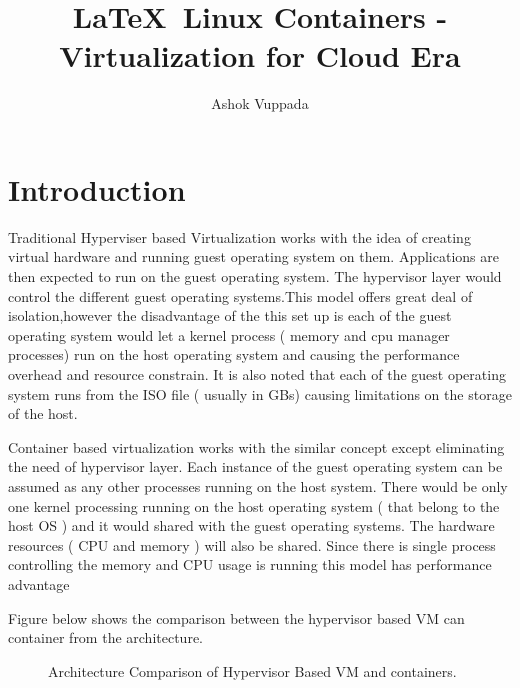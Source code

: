 \documentclass[9pt,twocolumn,twoside]{../../styles/osajnl}
\title{\LaTeX\ Linux Containers - Virtualization for  Cloud Era}
\author[1]{Ashok Vuppada}
\affil[1]{School of Informatics and Computing, Bloomington, IN 47408, U.S.A.}
\affil[*]{Corresponding authors: ashokmadhu66@gmail.com}
\begin{document}
\maketitle

\section{Introduction}

Traditional Hyperviser based Virtualization works with the idea of
creating virtual hardware and running guest operating system on
them. Applications are then expected to run on the guest operating
system. The hypervisor layer would control the different guest
operating systems.This model offers great deal of isolation,however
the disadvantage of the this set up is each of the guest operating
system would let a kernel process ( memory and cpu manager processes)
run on the host operating system and causing the performance overhead
and resource constrain. It is also noted that each of the guest
operating system runs from the ISO file ( usually in GBs) causing
limitations on the storage of the host. \cite{www-slashroot} 

Container based virtualization works with the similar concept except
eliminating the need of hypervisor layer. Each instance of the guest
operating system can be assumed as any other processes running on the
host system. There would be only one kernel processing running on the
host operating system ( that belong to the host OS ) and it would
shared with the guest operating systems. The hardware resources ( CPU
and memory ) will also be shared. Since there is single process
controlling the memory and CPU usage is running this model has
performance advantage \cite{www-slashroot}

Figure below shows the comparison between the hypervisor based VM can
container from the architecture.\cite{www-slashroot}

\begin{figure}[htbp]
\centering
{}
\caption{Architecture Comparison of Hypervisor Based VM and containers.}
\label{fig:false-color}
\end{figure}
\end{document}
